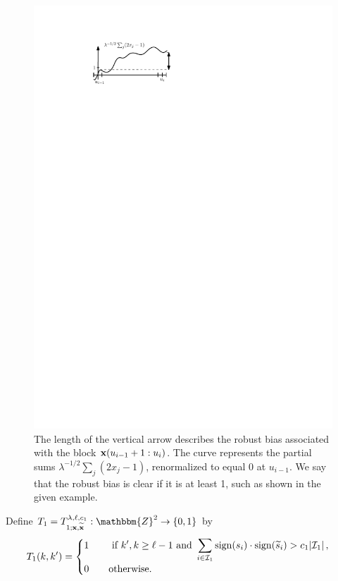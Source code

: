 \documentclass[final,12pt]{colt2018} %
\newcommand{\Z}{\mathbbm{Z}}
\newcommand{\1}{\mathbf{1}}
\def\disp{\displaystyle}
\newcommand{\eqb}{\begin{equation}}
\newcommand{\eqe}{\end{equation}}
\newcommand{\op}{\operatorname}
\newcommand{\wt}{\widetilde}
\newcommand{\mcl}{\mathcal}
\def\xt{{\wt {\bf x}}}
\def\x{{\bf x}}
\begin{document}
\begin{figure}[h]
	\centering
	\includegraphics[scale=1]{robustbias}
	\caption{The length of the vertical arrow describes the robust bias
		associated with the block $\x(u_{i-1} + 1 : u_i)$.  The curve
		represents the partial sums $\lambda^{-1/2}\sum_j (2x_j-1)$,
		renormalized to equal 0 at $u_{i-1}$. We say that the robust bias
		is clear if it is at least 1, such as shown in the given example.}
	\label{fig:robust}
\end{figure}

Define $T_1=T_{1;\x,\xt}^{\lambda,\ell,c_1}:\Z^2\to\{0,1 \}$  by
\eqb \label{eq33}
T_1(k,k') =
\begin{cases}
	1 \qquad \disp \text{\,\,if\,\,} k' ,k \geq \ell - 1 \text{\,\,and\,\,}
	\sum_{i \in \mcl I_1} \op{sign}(s_i) \cdot \op{sign}(\wt s_i) >
	c_1 |\mcl I_1| \, , \\
	0 \qquad \text{otherwise}.
\end{cases}
\eqe
\end{document}
